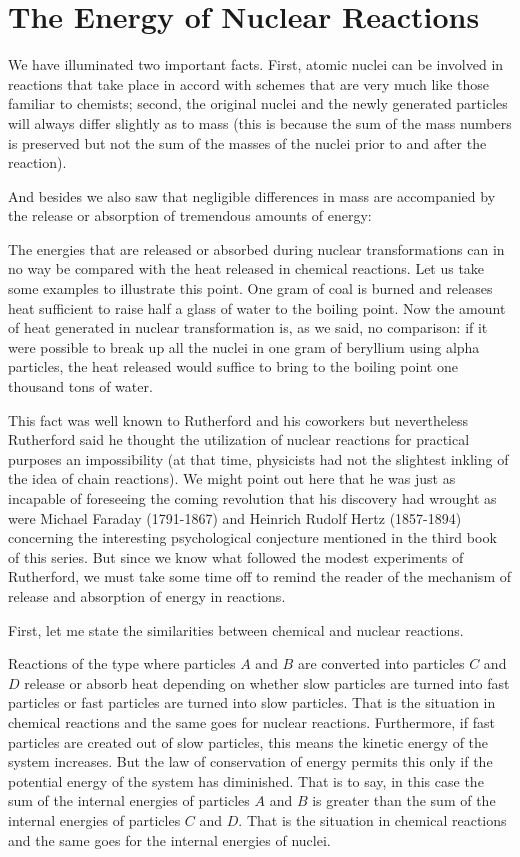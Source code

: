 \section{The Energy of Nuclear Reactions}

We have illuminated two important facts. First, atom­ic nuclei can be involved in reactions that take place in accord with schemes that are very much like those familiar to chemists; second, the original nuclei and the newly generated particles will always differ slightly as to mass (this is because the sum of the mass numbers is preserved but not the sum of the masses of the nuclei prior to and after the reaction).

And besides we also saw that negligible differences in mass are accompanied by the release or absorption of tremendous amounts of energy:

The energies that are released or absorbed during nu­clear transformations can in no way be compared with the heat released in chemical reactions. Let us take some examples to illustrate this point. One gram of coal is burned and releases heat sufficient to raise half a glass of water to the boiling point. Now the amount of heat generated in nuclear transformation is, as we said, no comparison: if it were possible to break up all the nuclei in one gram of beryllium using alpha particles, the heat released would suffice to bring to the boiling point one thousand tons of water.

This fact was well known to Rutherford and his coworkers but nevertheless Rutherford said he thought the utilization of nuclear reactions for practical purposes an impossibility (at that time, physicists had not the slight­est inkling of the idea of chain reactions). We might point out here that he was just as incapable of foreseeing the coming revolution that his discovery had wrought as were Michael Faraday (1791-1867) and Heinrich Ru­dolf Hertz (1857-1894) concerning the interesting psychological conjecture mentioned in the third book of this series. But since we know what followed the modest experi­ments of Rutherford, we must take some time off to remind the reader of the mechanism of release and ab­sorption of energy in reactions.

First, let me state the similarities between chemical and nuclear reactions.

Reactions of the type where particles $A$ and $B$ are converted into particles $C$ and $D$ release or absorb heat depending on whether slow particles are turned into fast particles or fast particles are turned into slow particles. That is the situation in chemical reactions and the same goes for nuclear reactions. Furthermore, if fast particles are created out of slow particles, this means the kinetic energy of the system increases. But the law of conserva­tion of energy permits this only if the potential energy of the system has diminished. That is to say, in this case the sum of the internal energies of particles $A$ and $B$ is greater than the sum of the internal energies of parti­cles $C$ and $D$. That is the situation in chemical reac­tions and the same goes for the internal energies of nuclei.

